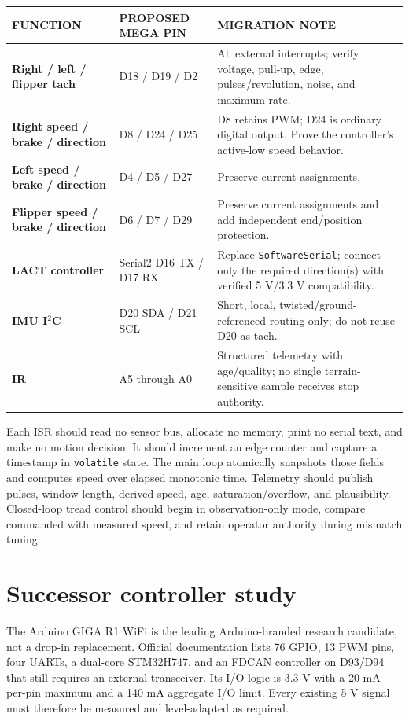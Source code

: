 \documentclass[10pt,openany]{book}
\begin{document}
\begin{tabularx}{\textwidth}{>{\robcondensed\bfseries}p{1.48in} p{1.12in} X}
\toprule
FUNCTION & PROPOSED MEGA PIN & MIGRATION NOTE\\
\midrule
Right / left / flipper tach & D18 / D19 / D2 & All external interrupts; verify voltage, pull-up, edge, pulses/revolution, noise, and maximum rate.\\
Right speed / brake / direction & D8 / D24 / D25 & D8 retains PWM; D24 is ordinary digital output. Prove the controller's active-low speed behavior.\\
Left speed / brake / direction & D4 / D5 / D27 & Preserve current assignments.\\
Flipper speed / brake / direction & D6 / D7 / D29 & Preserve current assignments and add independent end/position protection.\\
LACT controller & Serial2 D16 TX / D17 RX & Replace \texttt{SoftwareSerial}; connect only the required direction(s) with verified 5 V/3.3 V compatibility.\\
IMU I$^2$C & D20 SDA / D21 SCL & Short, local, twisted/ground-referenced routing only; do not reuse D20 as tach.\\
IR & A5 through A0 & Structured telemetry with age/quality; no single terrain-sensitive sample receives stop authority.\\
\bottomrule
\end{tabularx}

Each ISR should read no sensor bus, allocate no memory, print no serial text, and make no motion decision. It should increment an edge counter and capture a timestamp in \texttt{volatile} state. The main loop atomically snapshots those fields and computes speed over elapsed monotonic time. Telemetry should publish pulses, window length, derived speed, age, saturation/overflow, and plausibility. Closed-loop tread control should begin in observation-only mode, compare commanded with measured speed, and retain operator authority during mismatch tuning.

\section{Successor controller study}

The Arduino GIGA R1 WiFi is the leading Arduino-branded research candidate, not a drop-in replacement. Official documentation lists 76 GPIO, 13 PWM pins, four UARTs, a dual-core STM32H747, and an FDCAN controller on D93/D94 that still requires an external transceiver. Its I/O logic is 3.3 V with a 20 mA per-pin maximum and a 140 mA aggregate I/O limit. Every existing 5 V signal must therefore be measured and level-adapted as required.
\end{document}
